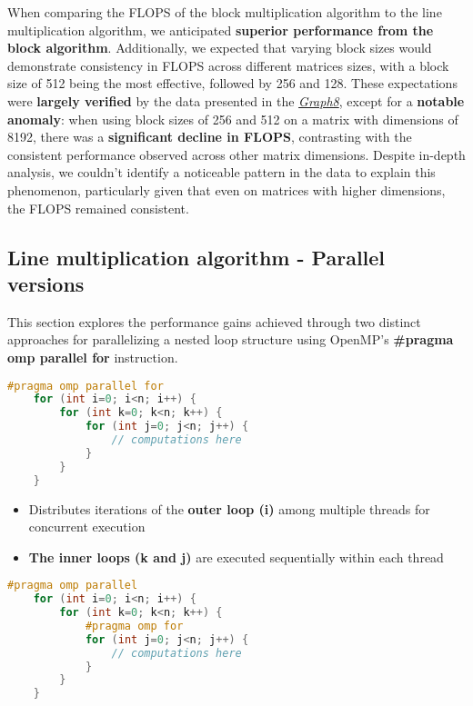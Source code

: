 When comparing the FLOPS of the block multiplication algorithm to
the line multiplication algorithm, we anticipated \textbf{superior performance
    from the block algorithm}. Additionally, we expected that varying block
sizes would demonstrate consistency in FLOPS across different matrices sizes,
with a block size of 512 being the most effective, followed by 256 and 128.
These expectations were \textbf{largely
    verified} by the data presented in the \textit{\hyperref[graph:BLG9]{Graph8}},
except for a \textbf{notable anomaly}:
when using block sizes of 256 and 512 on a matrix with dimensions of 8192,
there was a \textbf{significant decline in FLOPS}, contrasting with the consistent
performance observed across other matrix dimensions. Despite in-depth analysis,
we couldn't identify a noticeable pattern in the data to explain this phenomenon,
particularly given that even on matrices with higher dimensions, the FLOPS remained
consistent.

\newpage

\subsection{Line multiplication algorithm - Parallel versions}
This section explores the performance gains achieved through two distinct
approaches for parallelizing a nested loop structure using OpenMP's \textbf{\#pragma omp parallel
    for} instruction.

\hspace*{1cm}

\begin{lstlisting}[language=C++, caption=Parallel 1]
    #pragma omp parallel for
    for (int i=0; i<n; i++) {
        for (int k=0; k<n; k++) {
            for (int j=0; j<n; j++) {
                // computations here
            }
        }
    }
\end{lstlisting}

\begin{itemize}
    \item Distributes iterations of the \textbf{outer loop (i)} among multiple threads for concurrent execution
    \item \textbf{The inner loops (k and j)} are executed sequentially within each thread
\end{itemize}

\hspace*{1cm}

\begin{lstlisting}[language=C++, caption=Parallel 2]
    #pragma omp parallel
    for (int i=0; i<n; i++) {
        for (int k=0; k<n; k++) {
            #pragma omp for
            for (int j=0; j<n; j++) {
                // computations here
            }
        }
    }
\end{lstlisting}

